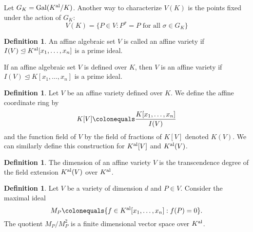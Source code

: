 \documentclass{dcthesis}
\newcommand{\defi}[1]{\textsf{#1}}
\newcommand{\Kal}{{{K}^{\textup{al}}}}
\DeclareMathOperator{\Gal}{Gal}
\numberwithin{equation}{section}
\theoremstyle{definition}
\newtheorem{definition}[equation]{Definition}
\theoremstyle{remark}
\begin{document}
{{    Let $G_K = \Gal(\Kal/K)$.
    Another way to characterize $V(K)$ is
    the points fixed under the action of $G_K$:
    \begin{equation}
      \label{eqn:galoisactiononV}
      V(K) =
      \{P\in V : P^\sigma = P\text{ for all }\sigma\in G_K\}
    \end{equation}
    \begin{definition}
      \label{def:affinevariety}
      An affine algebraic set $V$ is called
      an \defi{affine variety}
      if $I(V)\trianglelefteq\Kal[x_1,\dots,x_n]$ is a prime ideal.
    \end{definition}
    If an affine algebraic set $V$ is defined over $K$,
    then $V$ is an affine variety if
    $I(V)\trianglelefteq K[x_1,\dots,x_n]$
    is a prime ideal.
    \begin{definition}
      \label{def:coordinateringfunctionfield}
      Let $V$ be an affine variety defined over $K$.
      We define the
      \defi{affine coordinate ring}
      by
      \[
        K[V]
        \colonequals
        \frac{
          K[x_1,\dots,x_n]
        }{
        I(V)
        }
      \]
      and the
      \defi{function field of $V$}
      by the field of fractions of $K[V]$
      denoted $K(V)$.
      We can similarly define this construction
      for $\Kal[V]$ and $\Kal(V)$.
    \end{definition}
    \begin{definition}
      \label{def:dimension}
      The \defi{dimension}
      of an affine variety $V$
      is the transcendence degree of the field extension
      $\Kal(V)$ over $\Kal$.
    \end{definition}
    \begin{definition}
      \label{def:nonsingular}
      Let $V$ be a variety of dimension $d$
      and $P\in V$.
      Consider the maximal ideal
      \[
        M_P\colonequals
        \{f\in\Kal[x_1,\dots,x_n]:f(P)=0\}.
      \]
      The quotient $M_P/M_P^2$ is a finite dimensional
      vector space over $\Kal$.

\end{definition}}}
\end{document}
